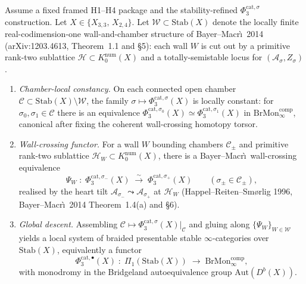 \begin{theorem}
\label{thm:cy-c-bicubic-24CI-phi-three-cat-sigma-local-system}
Assume a fixed framed H1--H4 package and the stability-refined
$\Phi_3^{\mathrm{cat},\sigma}$ construction.
Let $X \in \{X_{3,3},\, X_{2,4}\}$. Let
$\mathcal W \subset \mathrm{Stab}(X)$ denote the locally finite
real-codimension-one wall-and-chamber structure of Bayer--Macr\`\i\
2014 (arXiv:1203.4613, Theorem~1.1 and \S 5): each wall $W$ is cut
out by a primitive rank-two sublattice
$\mathcal{H} \subset K_0^{\mathrm{num}}(X)$ and a totally-semistable
locus for $(\mathcal A_\sigma, Z_\sigma)$.
\begin{enumerate}[label=\textup{(\roman*)}]
 \item \emph{Chamber-local constancy.} On each connected open chamber
 $\mathcal C \subset \mathrm{Stab}(X) \setminus \mathcal W$, the
 family
 $\sigma \mapsto \Phi_3^{\mathrm{cat},\sigma}(X)$
 is locally constant: for
 $\sigma_0, \sigma_1 \in \mathcal C$ there is an equivalence
 $\Phi_3^{\mathrm{cat},\sigma_0}(X) \simeq
 \Phi_3^{\mathrm{cat},\sigma_1}(X)$ in
 $\mathrm{BrMon}^{\mathrm{comp}}_\infty$, canonical after fixing
 the coherent wall-crossing homotopy torsor.
 \item \emph{Wall-crossing functor.} For a wall $W$ bounding chambers
 $\mathcal C_\pm$ and primitive rank-two sublattice
 $\mathcal H_W \subset K_0^{\mathrm{num}}(X)$, there is a
 Bayer--Macr\`\i\ wall-crossing equivalence
 \[
 \Psi_W \;:\;
 \Phi_3^{\mathrm{cat},\sigma_-}(X)
 \;\xrightarrow{\sim}\;
 \Phi_3^{\mathrm{cat},\sigma_+}(X)
 \qquad (\sigma_\pm \in \mathcal C_\pm),
 \]
 realised by the heart tilt
 $\mathcal A_{\sigma_-} \leadsto \mathcal A_{\sigma_+}$ at
 $\mathcal H_W$ (Happel--Reiten--Sm\o{}rlig 1996, Bayer--Macr\`\i\
 2014 Theorem~1.4(a) and \S 6).
 \item \emph{Global descent.} Assembling $\mathcal C \mapsto
 \Phi_3^{\mathrm{cat},\sigma}(X)|_{\mathcal C}$ and gluing along
 $\{\Psi_W\}_{W \in \mathcal W}$ yields a local system of
 braided presentable stable $\infty$-categories over
 $\mathrm{Stab}(X)$, equivalently a functor
 \[
 \Phi_3^{\mathrm{cat},\bullet}(X) \;:\;
 \Pi_1(\mathrm{Stab}(X)) \;\longrightarrow\;
 \mathrm{BrMon}^{\mathrm{comp}}_\infty,
 \]
 with monodromy in the Bridgeland autoequivalence group
 $\mathrm{Aut}(D^b(X))$.
\end{enumerate}
\end{theorem}

